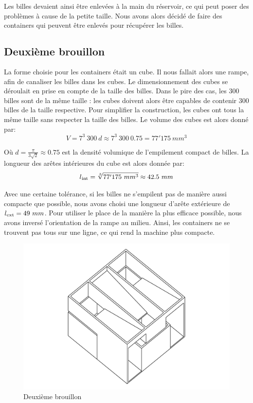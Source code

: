Les billes devaient ainsi être enlevées à la main du réservoir, ce qui peut poser des problèmes à cause de la petite taille. Nous avons alors décidé de faire des containers qui peuvent être enlevés pour récupérer les billes. 

\subsection{Deuxième brouillon}
La forme choisie pour les containers était un cube. Il nous fallait alors une rampe, afin de canaliser les billes dans les cubes.  Le dimensionnement des cubes se déroulait en prise en compte de la taille des billes. Dans le pire des cas, les 300 billes sont de la même taille : les cubes doivent alors être capables de contenir 300 billes de la taille respective. Pour simplifier la construction, les cubes ont tous la même taille sans respecter la taille des billes. Le volume des cubes est alors donné par:
\begin{equation}
    V = 7^3\ 300\ d \approx 7^3\ 300\ 0.75 = 77'175\ mm^3
    \label{eq:volumereservoirfin}
\end{equation}

Où \(d = \frac{ \pi }{3\sqrt{2}} \approx 0.75\) est la densité volumique de l'empilement compact de billes. La longueur des arêtes intérieures du cube est alors donnée par: 
\[l\textsubscript{int}=\sqrt[3]{77'175\ mm^3} \approx 42.5\ mm\]

Avec une certaine tolérance, si les billes ne s'empilent pas de manière aussi compacte que possible, nous avons choisi une longueur d'arête extérieure de \({l\textsubscript{ext}=49~mm}\). Pour utiliser le place de la manière la plus efficace possible, nous avons inversé l'orientation de la rampe au milieu. Ainsi, les containers ne se trouvent pas tous sur une ligne, ce qui rend la machine plus compacte. 

\begin{figure}
    \centering
    \includegraphics[width=\textwidth]{Graphics/Reservoir_final/DEUXIEME_BROUILLON.pdf}
    \caption{Deuxième brouillon}
\end{figure}

